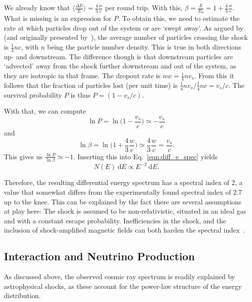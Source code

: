 We already know that $\big\langle\frac{\Delta E}{E}\big\rangle = \frac{4}{3}\frac{w}{c}$ per round trip. With this, $\beta = \frac{E}{E_0} = 1 + \frac{4}{3}\frac{w}{c}$. What is missing is an expression for $P$. To obtain this, we need to estimate the rate at which particles drop out of the system or are `swept away'. As argued by~\cite{Longair2011} (and originally presented by~), the average number of particles crossing the shock is $\frac{1}{4} n c$, with $n$ being the particle number density. This is true in both directions up- and downstream. The difference though is that downstream particles are `advected' away from the shock further downstream and out of the system, as they are isotropic in that frame. The dropout rate is $n w=\frac{1}{4}nv_s$. From this it follows that the fraction of particles lost (per unit time) is $\frac{1}{4} n v_s/\frac{1}{4}nc = v_s/c$. The survival probability $P$ is thus $P=(1-v_s/c)$.

With that, we can compute
\begin{equation}
    \ln P = \ln \big( 1-\frac{v_s}{c}\big) \simeq -\frac{v_s}{c}
\end{equation}
and
\begin{equation}
    \ln \beta = \ln \bigl( 1+\frac{4}{3}\frac{w}{c} \bigr)  \simeq \frac{4}{3}\frac{w}{c} = \frac{v_s}{c}.
\end{equation}
This gives us $\frac{\ln P}{\ln \beta} \simeq -1$. Inserting this into Eq.~\ref{eqn:diff_e_spec} yields
\begin{equation}
    N(E)~\text{d} E \propto E^{-2}~\text{d} E.
\end{equation}

Therefore, the resulting differential energy spectrum has a spectral index of 2, a value that somewhat differs from the experimentally found spectral index of 2.7 up to the knee. This can be explained by the fact there are several assumptions at play here: The shock is assumed to be non-relativistic, situated in an ideal gas and with a constant escape probability. Inefficiencies in the shock, and the inclusion of shock-amplified magnetic fields can both harden the spectral index~\cite{Spurio2018}.

\subsection{Interaction and Neutrino Production}\label{cr_interactions}
As discussed above, the observed cosmic ray spectrum is readily explained by astrophysical shocks, as these account for the power-law structure of the energy distribution.

